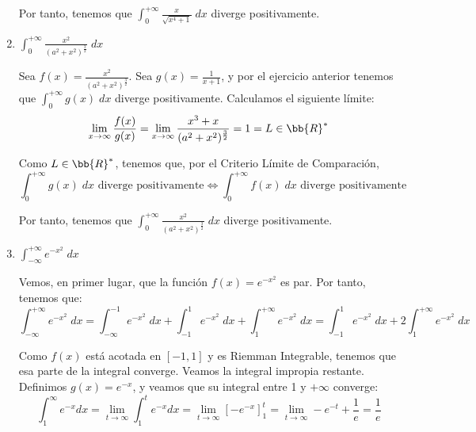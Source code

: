 \begin{ejercicio}
\begin{enumerate}
    Por tanto, tenemos que  $\displaystyle \int_0^{+\infty} \frac{x}{\sqrt{x^4+1}}\;dx$ diverge positivamente.



    \item $\displaystyle \int_0^{+\infty} \frac{x^2}{(a^2+x^2)^\frac{3}{2}}\;dx$

    Sea $f(x)=\frac{x^2}{(a^2+x^2)^\frac{3}{2}}$.
    Sea $g(x)=\frac{1}{x+1}$, y por el ejercicio anterior tenemos que $\int_0^{+\infty} g(x)\;dx$ diverge positivamente. Calculamos el siguiente límite:
    \begin{equation*}
        \lim_{x\to \infty} \frac{f(x)}{g(x)}
        = \lim_{x\to \infty} \frac{x^3+x}{(a^2+x^2)^\frac{3}{2}} = 1=L\in \bb{R}^\ast
    \end{equation*}
    
    Como $L\in \bb{R}^\ast$, tenemos que, por el Criterio Límite de Comparación,
    \begin{equation*}
        \int_0^{+\infty} g(x)\;dx \text{ diverge positivamente} \Longleftrightarrow 
        \int_0^{+\infty} f(x)\;dx \text{ diverge positivamente}
    \end{equation*}

    Por tanto, tenemos que  $\displaystyle \int_0^{+\infty} \frac{x^2}{(a^2+x^2)^\frac{3}{2}}\;dx$ diverge positivamente.




    \item $\displaystyle \int_{-\infty}^{+\infty} e^{-x^2}\;dx$

    Vemos, en primer lugar, que la función $f(x)=e^{-x^2}$ es par. Por tanto, tenemos que:
    \begin{equation*}
        \int_{-\infty}^{+\infty} e^{-x^2}\;dx
        = \int_{-\infty}^{-1} e^{-x^2}\;dx
        + \int_{-1}^{1} e^{-x^2}\;dx
        + \int_{1}^{+\infty} e^{-x^2}\;dx
        = \int_{-1}^{1} e^{-x^2}\;dx
        + 2\int_{1}^{+\infty} e^{-x^2}\;dx
    \end{equation*}

    Como $f(x)$ está acotada en $[-1,1]$ y es Riemman Integrable, tenemos que esa parte de la integral converge. Veamos la integral impropia restante. Definimos $g(x)=e^{-x}$, y veamos que su integral entre 1 y $+\infty$ converge:
    \begin{equation*}
        \int_1^\infty e^{-x}dx = \lim_{t\to \infty} \int_1^te^{-x}dx
        = \lim_{t\to \infty} \left[-e^{-x}\right]_1^t
        = \lim_{t\to \infty} -e^{-t} +\frac{1}{e} = \frac{1}{e}
    \end{equation*}


\end{enumerate}
\end{ejercicio}
